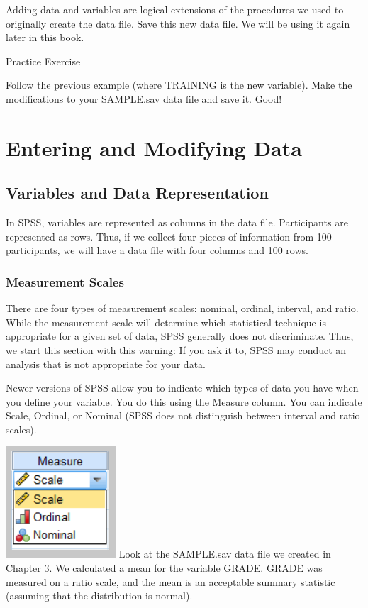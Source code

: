 \documentclass[
]{book}
\begin{document}
Adding data and variables are logical extensions of the procedures we used to originally create the data file. Save this new data file. We will be using it again later in this book.

Practice Exercise

Follow the previous example (where TRAINING is the new variable). Make the modifications to your SAMPLE.sav data file and save it. Good!

\hypertarget{entering-and-modifying-data}{%
\chapter{Entering and Modifying Data}\label{entering-and-modifying-data}}

\hypertarget{variables-and-data-representation}{%
\section{Variables and Data Representation}\label{variables-and-data-representation}}

In SPSS, variables are represented as columns in the data file. Participants are represented as rows. Thus, if we collect four pieces of information from 100 participants, we will have a data file with four columns and 100 rows.

\hypertarget{measurement-scales}{%
\subsection{Measurement Scales}\label{measurement-scales}}

There are four types of measurement scales: nominal, ordinal, interval, and ratio. While the measurement scale will determine which statistical technique is appropriate for a given set of data, SPSS generally does not discriminate. Thus, we start this section with this warning: If you ask it to, SPSS may conduct an analysis that is not appropriate for your data.

Newer versions of SPSS allow you to indicate which types of data you have when you define your variable. You do this using the Measure column. You can indicate Scale, Ordinal, or Nominal (SPSS does not distinguish between interval and ratio scales).

\includegraphics{MeasureLevel1.png}
Look at the SAMPLE.sav data file we created in Chapter 3. We calculated a mean for the variable GRADE. GRADE was measured on a ratio scale, and the mean is an acceptable summary statistic (assuming that the distribution is normal).
\end{document}
